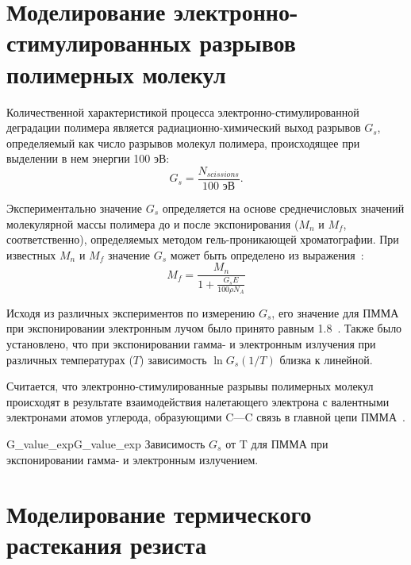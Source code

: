 \section{Моделирование электронно-стимулированных разрывов полимерных молекул}
Количественной характеристикой процесса электронно-стимулированной деградации полимера является радиационно-химический выход разрывов $G_s$, определяемый как число разрывов молекул полимера, происходящее при выделении в нем энергии 100 эВ:
\begin{equation}
	G_s = \frac{N_{scissions}}{100 \text{ эВ}}.
\end{equation}

Экспериментально значение $G_s$ определяется на основе среднечисловых значений молекулярной массы полимера до и после экспонирования ($M_n$ и $M_f$, соответственно), определяемых методом гель-проникающей хроматографии. При известных $M_n$ и $M_f$ значение $G_s$ может быть определено из выражения~\cite{Greeneich1979_Mf_Mn}:
\begin{equation}
	{M_f = \frac{\displaystyle M_n}{1 + \frac{\displaystyle G_s E}{\displaystyle 100 \rho N_A}}}
\end{equation}

Исходя из различных экспериментов по измерению $G_s$, его значение для ПММА при экспонировании электронным лучом было принято равным 1.8~\cite{Charlesby_1964_Gs}. Также было установлено, что при экспонировании гамма- и электронным излучения при различных температурах ($T$) зависимость $\ln G_s (1/T)$ близка к линейной.

Считается, что электронно-стимулированные разрывы полимерных молекул происходят в результате взаимодействия налетающего электрона с валентными электронами атомов углерода, образующими C---C связь в главной цепи ПММА~\cite{Stepanova_2006}.

\begin{narrowfig}{G_value_exp}{G_value_exp}
	Зависимость $G_s$ от T для ПММА при экспонировании гамма- и электронным излучением.
\end{narrowfig}





\section{Моделирование термического растекания резиста}

